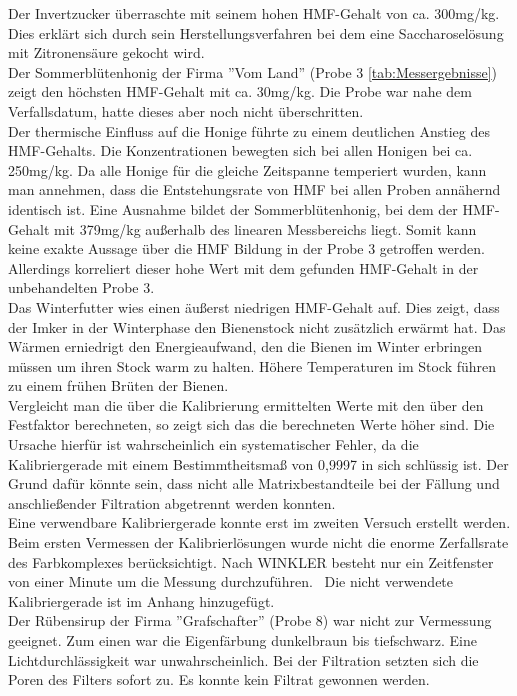 Der Invertzucker überraschte mit seinem hohen HMF-Gehalt von ca. 300mg/kg. Dies erklärt sich durch sein Herstellungsverfahren bei dem eine Saccharoselösung mit Zitronensäure gekocht wird.\\
Der Sommerblütenhonig der Firma ''Vom Land'' (Probe 3 \ref{tab:Messergebnisse}) zeigt den höchsten HMF-Gehalt mit ca. 30mg/kg. Die Probe war nahe dem Verfallsdatum, hatte dieses aber noch nicht überschritten.\\
Der thermische Einfluss auf die Honige führte zu einem deutlichen Anstieg des HMF-Gehalts. Die Konzentrationen bewegten sich bei allen Honigen bei ca. 250mg/kg. Da alle Honige für die gleiche Zeitspanne temperiert wurden, kann man annehmen, dass die Entstehungsrate von HMF bei allen Proben annähernd identisch ist. Eine Ausnahme bildet der Sommerblütenhonig, bei dem der HMF-Gehalt mit 379mg/kg außerhalb des linearen Messbereichs liegt. Somit kann keine exakte Aussage über die HMF Bildung in der Probe 3 getroffen werden. Allerdings korreliert dieser hohe Wert mit dem gefunden HMF-Gehalt in der unbehandelten Probe 3.\\
Das Winterfutter wies einen äußerst niedrigen HMF-Gehalt auf. Dies zeigt, dass der Imker in der Winterphase den Bienenstock nicht zusätzlich erwärmt hat. Das Wärmen erniedrigt den Energieaufwand, den die Bienen im Winter erbringen müssen um ihren Stock warm zu halten. Höhere Temperaturen im Stock führen zu einem frühen Brüten der Bienen.\\
Vergleicht man die über die Kalibrierung ermittelten Werte mit den über den Festfaktor berechneten, so zeigt sich das die berechneten Werte höher sind. Die Ursache hierfür ist wahrscheinlich ein systematischer Fehler, da die Kalibriergerade mit einem Bestimmtheitsmaß von 0,9997 in sich schlüssig ist. Der Grund dafür könnte sein, dass nicht alle Matrixbestandteile bei der Fällung und anschließender Filtration abgetrennt werden konnten.\\
Eine verwendbare Kalibriergerade konnte erst im zweiten Versuch erstellt werden. Beim ersten Vermessen der Kalibrierlösungen wurde nicht die enorme Zerfallsrate des Farbkomplexes berücksichtigt. Nach WINKLER besteht nur ein Zeitfenster von einer Minute um die Messung durchzuführen.~\cite{Winkler} Die nicht verwendete Kalibriergerade ist im Anhang hinzugefügt.\\
Der Rübensirup der Firma ''Grafschafter'' (Probe 8) war nicht zur Vermessung geeignet. Zum einen war die Eigenfärbung dunkelbraun bis tiefschwarz. Eine Lichtdurchlässigkeit war unwahrscheinlich. Bei der Filtration setzten sich die Poren des Filters sofort zu. Es konnte kein Filtrat gewonnen werden.\\
